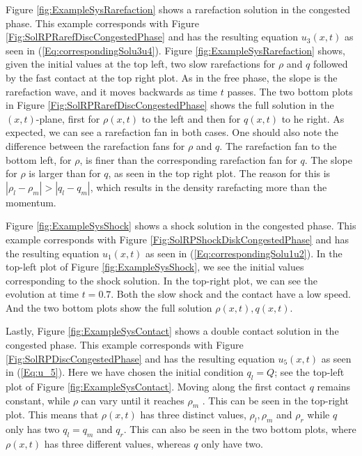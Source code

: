\documentclass[10pt]{article}
\numberwithin{equation}{section}
\begin{document}
\begin{figure}
\end{figure}Figure \ref{fig:ExampleSysRarefaction} shows a rarefaction solution in the congested phase. This example corresponds with Figure \ref{Fig:SolRPRarefDiscCongestedPhase} and has the resulting equation $u_3(x,t)$ as seen in (\ref{Eq:correspondingSolu3u4}). Figure \ref{fig:ExampleSysRarefaction} shows, given the initial values at the top left, two slow rarefactions for $\rho$ and $q$ followed by the fast contact at the top right plot. As in the free phase, the slope is the rarefaction wave, and it moves backwards as time $t$ passes.  The two bottom plots in Figure \ref{Fig:SolRPRarefDiscCongestedPhase} shows the full solution in the $(x,t)$-plane, first for $\rho(x,t)$ to the left and then for $q(x,t)$ to he right. As expected, we can see a rarefaction fan in both cases. One should also note the difference between the rarefaction fans for $\rho$ and $q$. The rarefaction fan to the bottom left, for $\rho$, is finer than the corresponding rarefaction fan for $q$. The slope for $\rho$ is larger than for $q$, as seen in the top right plot. The reason for this is $|\rho_l - \rho_m| > |q_l - q_m|$, which results in the density rarefacting more than the momentum. 

Figure \ref{fig:ExampleSysShock} shows a shock solution in the congested phase. This example corresponds with Figure \ref{Fig:SolRPShockDiskCongestedPhase} and has the resulting equation $u_1(x,t)$ as seen in (\ref{Eq:correspondingSolu1u2}). In the top-left plot of Figure \ref{fig:ExampleSysShock}, we see the initial values corresponding to the shock solution. In the top-right plot, we can see the evolution at time $t = 0.7$. Both the slow shock and the contact have a low speed. And the two bottom plots show the full solution $\rho(x,t), q(x,t)$.

Lastly, Figure \ref{fig:ExampleSysContact} shows a double contact solution in the congested phase. This example corresponds with Figure \ref{Fig:SolRPDiscCongestedPhase} and has the resulting equation $u_5(x,t)$ as seen in (\ref{Eq:u_5}). Here we have chosen the initial condition $q_l = Q$; see the top-left plot of Figure \ref{fig:ExampleSysContact}. Moving along the first contact $q$ remains constant, while $\rho$ can vary until it reaches $\rho_m$ . This can be seen in the top-right plot. This means that $\rho(x,t)$ has three distinct values, $\rho_l, \rho_m $ and $\rho_r$ while $q$ only has two $q_l = q_m$ and $q_r$. This can also be seen in the two bottom plots, where $\rho(x,t)$ has three different values, whereas $q $ only have two. 
\end{document}
